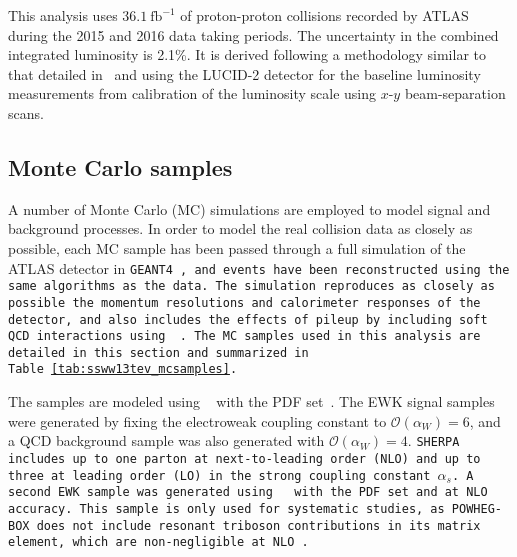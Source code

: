 This analysis uses $36.1~\textrm{fb}^{-1}$ of  proton-proton collisions recorded by ATLAS during the 2015 and 2016 data taking periods.
The uncertainty in the combined integrated luminosity is 2.1\%. It is derived following a methodology similar to that detailed in~\cite{2016.atlas-luminosity-8tev} and using the LUCID-2 detector for the baseline luminosity measurements \cite{2018.atlas-luminosity-lucid2} from calibration of the luminosity scale using $x$-$y$ beam-separation scans. %

\subsection{Monte Carlo samples}\label{ssww13tev:mc}
A number of Monte Carlo (MC) simulations are employed to model signal and background processes.
In order to model the real collision data as closely as possible, each MC sample has been passed through a full simulation of the ATLAS detector in \tt{GEANT4}~\cite{2010.ATLAS-simulation-infrastructure, 2003.GEANT4}, and events have been reconstructed using the same algorithms as the data.
The simulation reproduces as closely as possible the momentum resolutions and calorimeter responses of the detector, and also includes the effects of pileup by including soft QCD interactions using ~\cite{2008.Pythia8}.
The MC samples used in this analysis are detailed in this section and summarized in Table~\ref{tab:ssww13tev_mcsamples}.

The \ssww samples are modeled using ~\cite{2009.Sherpa, 2008.CS_Shower, 2009.METS} with the \nnpdf PDF set~\cite{2015.NNPDF3}.
The EWK signal samples were generated by fixing the electroweak coupling constant to $\mathcal{O}(\alpha_W) = 6$, and a QCD background sample was also generated with $\mathcal{O}(\alpha_W) = 4$.
\tt{SHERPA} includes up to one parton at next-to-leading order (NLO) and up to three at leading order (LO) in the strong coupling constant $\alpha_s$.
A second \ssww EWK sample was generated using ~\cite{2010.powhegbox} with the \nnpdf PDF set and at NLO accuracy.
This sample is only used for systematic studies, as \tt{POWHEG-BOX} does not include resonant triboson contributions in its matrix element, which are non-negligible at NLO~\cite{2018.ssww-scattering-at-lhc}.

